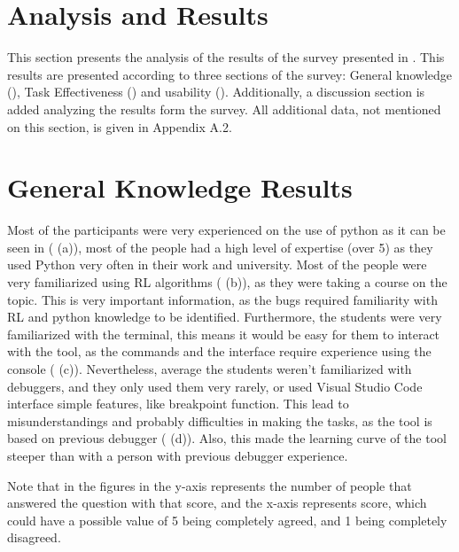 
\section{Analysis and Results}
\label{sec:results}

This section presents the analysis of the results of the survey presented in . 
This results are presented according to three sections of the survey: General knowledge (),
Task Effectiveness () and usability (). Additionally, a 
discussion section is added analyzing the results form the survey. All additional data, not mentioned 
on this section, is given in Appendix A.2.

\section{General Knowledge Results}
\label{sec:general-knowledge}
Most of the participants were very experienced on the use of python as it
can be seen in ( (a)), most of the people had a high level of expertise (over 5)
as they used Python very often in their work and university. 
Most of the people were very familiarized using \ac{RL} algorithms ( (b)), as they were 
taking a course on the topic. This is very important information, as the bugs required familiarity with \ac{RL} and python 
knowledge to be identified. Furthermore, the students were very familiarized with 
the terminal, this means it would be easy for them to interact with the tool, as the commands 
and the interface require experience using the console ( (c)). Nevertheless, 
average the 
students weren't familiarized with debuggers, and they only used them very rarely, or used 
Visual Studio Code interface simple features, like breakpoint function. This lead to 
misunderstandings and probably difficulties in making the tasks, as the tool is based on
previous debugger ( (d)). Also, this made the learning curve of the tool 
steeper than with a person with previous debugger experience.

Note that in the figures in  the y-axis represents the number of people 
that answered the question with that score, and the x-axis represents score, which could have a 
possible value of 5 being completely agreed, and 1 being completely disagreed.

